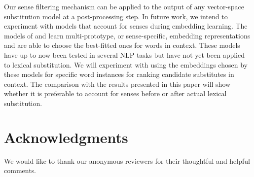\documentclass[11pt]{article}
\begin{document}
Our sense filtering mechanism can be applied to the output of any vector-space substitution model at a post-processing step. In future work, we intend to experiment with models that account for senses during embedding learning. The models of  and  learn multi-prototype, or sense-specific, embedding representations and are able to choose the best-fitted ones for words in context. These models have up to now been tested in several NLP tasks but have not yet been applied to lexical substitution. We will experiment with using the embeddings chosen by these models for specific word instances for ranking candidate substitutes in context. The comparison with the results presented in this paper will show whether it is preferable to account for senses before or after actual lexical substitution.

\section*{Acknowledgments}

We would like to thank our anonymous reviewers for their thoughtful and helpful comments.



\end{document}
